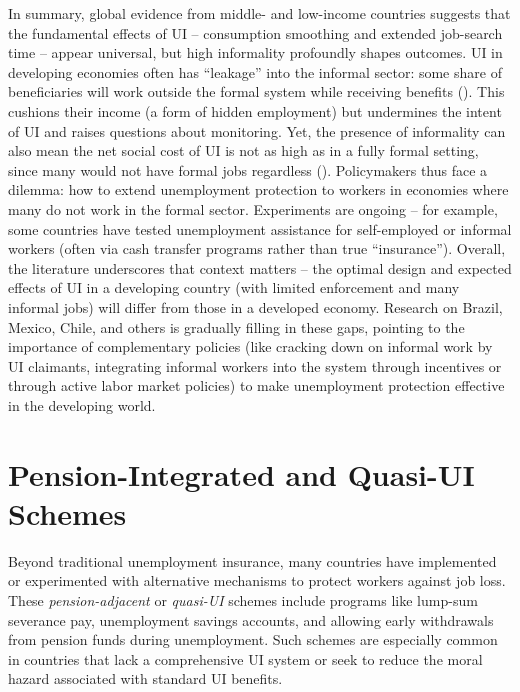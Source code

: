 \documentclass[
  4pt,
]{report}
\begin{document}
In summary, global evidence from middle- and low-income countries
suggests that the fundamental effects of UI -- consumption smoothing and
extended job-search time -- appear universal, but high informality
profoundly shapes outcomes. UI in developing economies often has
``leakage'' into the informal sector: some share of beneficiaries will
work outside the formal system while receiving benefits
(). This cushions their income (a
form of hidden employment) but undermines the intent of UI and raises
questions about monitoring. Yet, the presence of informality can also
mean the net social cost of UI is not as high as in a fully formal
setting, since many would not have formal jobs regardless
(). Policymakers thus
face a dilemma: how to extend unemployment protection to workers in
economies where many do not work in the formal sector. Experiments are
ongoing -- for example, some countries have tested unemployment
assistance for self-employed or informal workers (often via cash
transfer programs rather than true ``insurance''). Overall, the
literature underscores that context matters -- the optimal design and
expected effects of UI in a developing country (with limited enforcement
and many informal jobs) will differ from those in a developed economy.
Research on Brazil, Mexico, Chile, and others is gradually filling in
these gaps, pointing to the importance of complementary policies (like
cracking down on informal work by UI claimants, integrating informal
workers into the system through incentives or through active labor
market policies) to make unemployment protection effective in the
developing world.

\section{Pension-Integrated and Quasi-UI
Schemes}\label{pension-integrated-and-quasi-ui-schemes}

Beyond traditional unemployment insurance, many countries have
implemented or experimented with alternative mechanisms to protect
workers against job loss. These \emph{pension-adjacent} or
\emph{quasi-UI} schemes include programs like lump-sum severance pay,
unemployment savings accounts, and allowing early withdrawals from
pension funds during unemployment. Such schemes are especially common in
countries that lack a comprehensive UI system or seek to reduce the
moral hazard associated with standard UI benefits.
\end{document}
